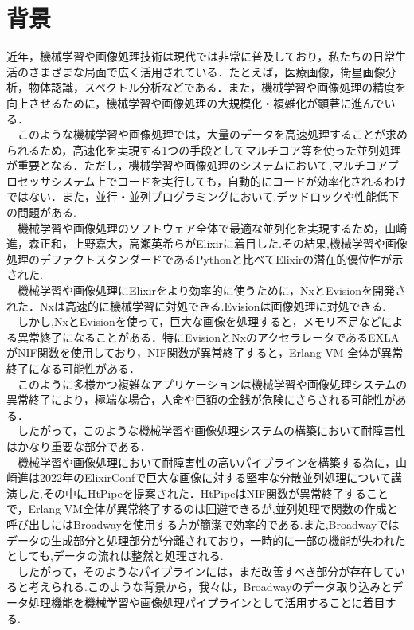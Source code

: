\documentclass[a4paper]{jreport}	%
\begin{document}
\section{背景}
近年，機械学習や画像処理技術は現代では非常に普及しており，私たちの日常生活のさまざまな局面で広く活用されている．たとえば，医療画像，衛星画像分析，物体認識，スペクトル分析などである．また，機械学習や画像処理の精度を向上させるために，機械学習や画像処理の大規模化・複雑化が顕著に進んでいる\cite{A}．
\\　このような機械学習や画像処理では，大量のデータを高速処理することが求められるため，高速化を実現する1つの手段としてマルチコア等を使った並列処理が重要となる．ただし，機械学習や画像処理のシステムにおいて,マルチコアプロセッサシステム上でコードを実行しても，自動的にコードが効率化されるわけではない．また，並行・並列プログラミングにおいて,デッドロックや性能低下の問題がある\cite{B}.
\\　機械学習や画像処理のソフトウェア全体で最適な並列化を実現するため，山崎進，森正和，上野嘉大，高瀬英希らがElixirに着目した.その結果,機械学習や画像処理のデファクトスタンダードであるPythonと比べてElixirの潜在的優位性が示された\cite{C}.
\\　機械学習や画像処理にElixirをより効率的に使うために，NxとEvisionを開発された．Nxは高速的に機械学習に対処できる.Evisionは画像処理に対処できる.
\\　しかし,NxとEvisionを使って，巨大な画像を処理すると，メモリ不足などによる異常終了になることがある．特にEvisionとNxのアクセラレータであるEXLAがNIF関数を使用しており，NIF関数が異常終了すると，Erlang VM 全体が異常終了になる可能性がある．
\\　このように多様かつ複雑なアプリケーションは機械学習や画像処理システムの異常終了により，極端な場合，人命や巨額の金銭が危険にさらされる可能性がある．
\\　したがって，このような機械学習や画像処理システムの構築において耐障害性はかなり重要な部分である．
\\　機械学習や画像処理において耐障害性の高いパイプラインを構築する為に，山崎進は2022年のElixirConfで巨大な画像に対する堅牢な分散並列処理について講演した,その中にHtPipeを提案された\cite{E}．HtPipeはNIF関数が異常終了することで，Erlang VM全体が異常終了するのは回避できるが,並列処理で関数の作成と呼び出しにはBroadwayを使用する方が簡潔で効率的である.また,Broadwayではデータの生成部分と処理部分が分離されており，一時的に一部の機能が失われたとしても,データの流れは整然と処理される.
\\　したがって，そのようなパイプラインには，まだ改善すべき部分が存在していると考えられる.このような背景から，我々は，Broadwayのデータ取り込みとデータ処理機能を機械学習や画像処理パイプラインとして活用することに着目する.
\end{document}
